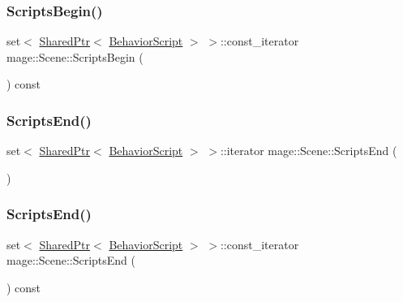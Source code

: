 \hypertarget{classmage_1_1_scene_abf8804b118e5ba4736ece404da0fbf90}{}\label{classmage_1_1_scene_abf8804b118e5ba4736ece404da0fbf90} 
\subsubsection{\texorpdfstring{Scripts\+Begin()}{ScriptsBegin()}\hspace{0.1cm}{\footnotesize\ttfamily [2/2]}}
{\footnotesize\ttfamily set$<$ \hyperlink{namespacemage_a1e01ae66713838a7a67d30e44c67703e}{Shared\+Ptr}$<$ \hyperlink{classmage_1_1_behavior_script}{Behavior\+Script} $>$ $>$\+::const\+\_\+iterator mage\+::\+Scene\+::\+Scripts\+Begin (\begin{DoxyParamCaption}{ }\end{DoxyParamCaption}) const}

\hypertarget{classmage_1_1_scene_a2b0d4504f5b683767f1cd08ca8ab6f42}{}\label{classmage_1_1_scene_a2b0d4504f5b683767f1cd08ca8ab6f42} 
\subsubsection{\texorpdfstring{Scripts\+End()}{ScriptsEnd()}\hspace{0.1cm}{\footnotesize\ttfamily [1/2]}}
{\footnotesize\ttfamily set$<$ \hyperlink{namespacemage_a1e01ae66713838a7a67d30e44c67703e}{Shared\+Ptr}$<$ \hyperlink{classmage_1_1_behavior_script}{Behavior\+Script} $>$ $>$\+::iterator mage\+::\+Scene\+::\+Scripts\+End (\begin{DoxyParamCaption}{ }\end{DoxyParamCaption})}

\hypertarget{classmage_1_1_scene_ab607911e4efd677a08f54101aa8bf2fb}{}\label{classmage_1_1_scene_ab607911e4efd677a08f54101aa8bf2fb} 
\subsubsection{\texorpdfstring{Scripts\+End()}{ScriptsEnd()}\hspace{0.1cm}{\footnotesize\ttfamily [2/2]}}
{\footnotesize\ttfamily set$<$ \hyperlink{namespacemage_a1e01ae66713838a7a67d30e44c67703e}{Shared\+Ptr}$<$ \hyperlink{classmage_1_1_behavior_script}{Behavior\+Script} $>$ $>$\+::const\+\_\+iterator mage\+::\+Scene\+::\+Scripts\+End (\begin{DoxyParamCaption}{ }\end{DoxyParamCaption}) const}

